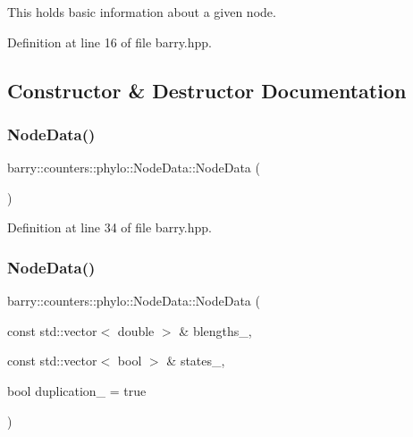 This holds basic information about a given node. 

Definition at line 16 of file barry.\+hpp.



\subsection{Constructor \& Destructor Documentation}
\mbox{\label{classbarry_1_1counters_1_1phylo_1_1_node_data_ab6c4e49f9964d587e4fba24f9bb41b30}} 
\subsubsection{\texorpdfstring{Node\+Data()}{NodeData()}\hspace{0.1cm}{\footnotesize\ttfamily [1/2]}}
{\footnotesize\ttfamily barry\+::counters\+::phylo\+::\+Node\+Data\+::\+Node\+Data (\begin{DoxyParamCaption}{ }\end{DoxyParamCaption})\hspace{0.3cm}{\ttfamily [inline]}}



Definition at line 34 of file barry.\+hpp.

\mbox{\label{classbarry_1_1counters_1_1phylo_1_1_node_data_a0559756b8139d402af5046755992d83a}} 
\subsubsection{\texorpdfstring{Node\+Data()}{NodeData()}\hspace{0.1cm}{\footnotesize\ttfamily [2/2]}}
{\footnotesize\ttfamily barry\+::counters\+::phylo\+::\+Node\+Data\+::\+Node\+Data (\begin{DoxyParamCaption}\item[{const std\+::vector$<$ double $>$ \&}]{blengths\+\_\+,  }\item[{const std\+::vector$<$ bool $>$ \&}]{states\+\_\+,  }\item[{bool}]{duplication\+\_\+ = {\ttfamily true} }\end{DoxyParamCaption})\hspace{0.3cm}{\ttfamily [inline]}}



